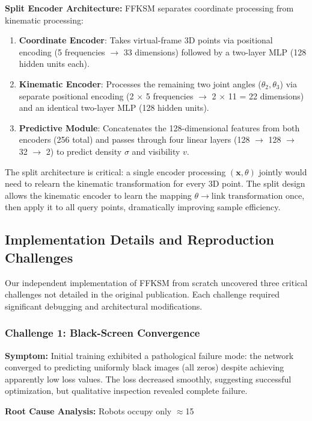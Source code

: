 \documentclass[12pt,a4paper,oneside]{report}
\begin{document}
\textbf{Split Encoder Architecture:} FFKSM separates coordinate processing from kinematic processing:
\begin{enumerate}
    \item \textbf{Coordinate Encoder}: Takes virtual-frame 3D points via positional encoding (5 frequencies $\rightarrow$ 33 dimensions) followed by a two-layer MLP (128 hidden units each).
    \item \textbf{Kinematic Encoder}: Processes the remaining two joint angles ($\theta_2, \theta_3$) via separate positional encoding (2 $\times$ 5 frequencies $\rightarrow$ 2 $\times$ 11 = 22 dimensions) and an identical two-layer MLP (128 hidden units).
    \item \textbf{Predictive Module}: Concatenates the 128-dimensional features from both encoders (256 total) and passes through four linear layers (128 $\rightarrow$ 128 $\rightarrow$ 32 $\rightarrow$ 2) to predict density $\sigma$ and visibility $v$.
\end{enumerate}
The split architecture is critical: a single encoder processing $(\mathbf{x}, \theta)$ jointly would need to relearn the kinematic transformation for every 3D point. The split design allows the kinematic encoder to learn the mapping $\theta \rightarrow \text{link transformation}$ once, then apply it to all query points, dramatically improving sample efficiency.

\subsection{Implementation Details and Reproduction Challenges}

Our independent implementation of FFKSM from scratch uncovered three critical challenges not detailed in the original publication. Each challenge required significant debugging and architectural modifications.

\subsubsection{Challenge 1: Black-Screen Convergence}

\textbf{Symptom:} Initial training exhibited a pathological failure mode: the network converged to predicting uniformly black images (all zeros) despite achieving apparently low loss values. The loss decreased smoothly, suggesting successful optimization, but qualitative inspection revealed complete failure.

\textbf{Root Cause Analysis:} Robots occupy only $\approx$15%
\end{document}

